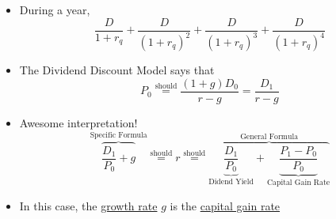 \documentclass{beamer}
\newcommand{\should}{\overset{\text{should}}{=}}
\begin{document}
\begin{frame}{}
\begin{itemize}
	\item During a year, 
		\begin{equation*}
			\frac{D}{1+r_{q}}+\frac{D}{(1+r_{q})^{2}}+\frac{D}{(1+r_{q})^{3}}+\frac{D}{(1+r_{q})^{4}}
		\end{equation*}
	\item The Dividend Discount Model says that
	\begin{equation*}
		P_{0}\should\frac{(1+g)D_{0}}{r-g}=\frac{D_{1}}{r-g}
	\end{equation*}
	\item Awesome interpretation!
	\begin{equation*}
		\overbrace{\frac{D_{1}}{P_{0}}+g}^{\text{Specific Formula}}\should r\should\overbrace{\underbrace{\frac{D_{1}}{P_{0}}}_{\text{Didend Yield}}+\underbrace{\frac{P_{1}-P_{0}}{P_{0}}}_{\text{Capital Gain Rate}}}^{\text{General Formula}}
	\end{equation*}
	\item In this case, the \underline{growth rate} $g$ is the \underline{capital gain rate}
\end{itemize}
\end{frame}

\begin{frame}{}
	
	\pause
	{\color{blue}}
\end{frame}

\begin{frame}{}
	
	\pause
	{\color{blue}}
\end{frame}

\begin{frame}{}
	
	\pause
	{\color{blue}}
\end{frame}

\end{document}
